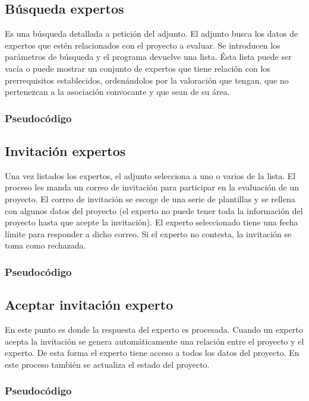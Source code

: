 \documentclass[12pt,a4paper,spanish,twoside]{book}
\begin{document}
\subsection{Búsqueda expertos}
Es una búsqueda detallada a petición del adjunto. El adjunto busca los datos de 
expertos que estén relacionados con el proyecto a evaluar. Se introducen los 
parámetros de búsqueda y el programa devuelve una lista. Ésta lista puede ser 
vacía o puede mostrar un conjunto de expertos que tiene relación con los 
prerrequisitos establecidos, ordenándolos por la valoración que tengan, que no 
pertenezcan a la asociación convocante y que sean de su área.

\subsubsection{Pseudocódigo}

\subsection{Invitación expertos}
Una vez listados los expertos, el adjunto selecciona a uno o varios 
de la lista. El proceso les manda un correo de invitación para participar en la 
evaluación de un proyecto. El correo de invitación se escoge de una serie de 
plantillas y se rellena con algunos datos del proyecto (el experto no puede 
tener toda la información del proyecto hasta que acepte la invitación). El 
experto seleccionado tiene una fecha límite para responder a dicho correo. Si el
experto no contesta, la invitación se toma como rechazada.

\subsubsection{Pseudocódigo}

\subsection{Aceptar invitación experto}
En este punto es donde la respuesta del experto es procesada. Cuando un experto 
acepta la invitación se genera automáticamente una relación entre el proyecto y 
el experto. De esta forma el experto tiene acceso a todos los datos del 
proyecto. En este proceso también se actualiza el estado del proyecto.

\subsubsection{Pseudocódigo}
\end{document}
